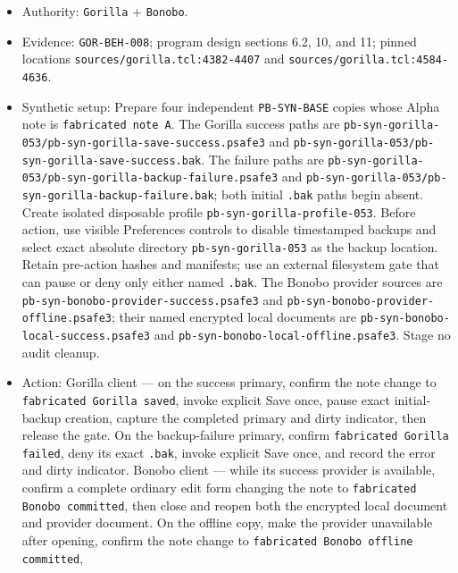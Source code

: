 \documentclass[
  letterpaper,
]{article}
\newcommand{\passthrough}[1]{#1}
\providecommand{\tightlist}{%
  \setlength{\itemsep}{0pt}\setlength{\parskip}{0pt}}
\begin{document}
\begin{itemize}
\tightlist
\item
  Authority: \passthrough{\lstinline!Gorilla!} + \passthrough{\lstinline!Bonobo!}.
\item
  Evidence: \nolinkurl{GOR-BEH-008}; program design sections 6.2, 10, and 11; pinned locations
  \nolinkurl{sources/gorilla.tcl:4382-4407} and \nolinkurl{sources/gorilla.tcl:4584-4636}.
\item
  Synthetic setup: Prepare four independent \nolinkurl{PB-SYN-BASE} copies whose Alpha note is
  \passthrough{\lstinline!fabricated note A!}. The Gorilla success paths are
  \nolinkurl{pb-syn-gorilla-053/pb-syn-gorilla-save-success.psafe3} and
  \nolinkurl{pb-syn-gorilla-053/pb-syn-gorilla-save-success.bak}. The failure paths are
  \nolinkurl{pb-syn-gorilla-053/pb-syn-gorilla-backup-failure.psafe3} and
  \nolinkurl{pb-syn-gorilla-053/pb-syn-gorilla-backup-failure.bak}; both initial \passthrough{\lstinline!.bak!} paths
  begin absent. Create isolated disposable profile \nolinkurl{pb-syn-gorilla-profile-053}. Before action, use visible
  Preferences controls to disable timestamped backups and select exact absolute directory \nolinkurl{pb-syn-gorilla-053}
  as the backup location. Retain pre-action hashes and manifests; use an external filesystem gate that can pause or deny
  only either named \passthrough{\lstinline!.bak!}. The Bonobo provider sources are
  \nolinkurl{pb-syn-bonobo-provider-success.psafe3} and \nolinkurl{pb-syn-bonobo-provider-offline.psafe3}; their named
  encrypted local documents are \nolinkurl{pb-syn-bonobo-local-success.psafe3} and
  \nolinkurl{pb-syn-bonobo-local-offline.psafe3}. Stage no audit cleanup.
\item
  Action: Gorilla client --- on the success primary, confirm the note change to
  \passthrough{\lstinline!fabricated Gorilla saved!}, invoke explicit Save once, pause exact initial-backup creation,
  capture the completed primary and dirty indicator, then release the gate. On the backup-failure primary, confirm
  \passthrough{\lstinline!fabricated Gorilla failed!}, deny its exact \passthrough{\lstinline!.bak!}, invoke explicit
  Save once, and record the error and dirty indicator. Bonobo client --- while its success provider is available,
  confirm a complete ordinary edit form changing the note to \passthrough{\lstinline!fabricated Bonobo committed!}, then
  close and reopen both the encrypted local document and provider document. On the offline copy, make the provider
  unavailable after opening, confirm the note change to \passthrough{\lstinline!fabricated Bonobo offline committed!},

\end{itemize}
\end{document}
